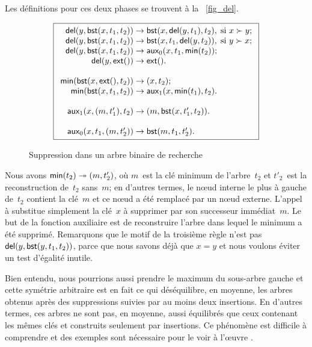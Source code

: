 Les définitions pour ces deux phases se trouvent à la
\fig~\vref{fig_del}.
\begin{figure}[!b]
\begin{equation*}
\boxed{
\begin{array}{r@{\;}l@{\;}l}
  \fun{del}(y,\fun{bst}(x,t_1,t_2)) & \rightarrow &
  \fun{bst}(x,\fun{del}(y,t_1),t_2),\; \text{si \(x \succ y\)};\\
\fun{del}(y,\fun{bst}(x,t_1,t_2)) & \rightarrow &
  \fun{bst}(x,t_1,\fun{del}(y,t_2)),\; \text{si \(y \succ x\)};\\
\fun{del}(y,\fun{bst}(x,t_1,t_2)) & \rightarrow & 
   \fun{aux}_0(x,t_1,\fun{min}(t_2));\\
\fun{del}(y,\fun{ext}()) & \rightarrow & \fun{ext}().\\
\\
\fun{min}(\fun{bst}(x,\fun{ext}(),t_2)) & \rightarrow & \pair{x}{t_2};\\
\fun{min}(\fun{bst}(x,t_1,t_2)) & \rightarrow & 
  \fun{aux}_1(x,\fun{min}(t_1),t_2).\\
\\
\fun{aux}_1(x,\pair{m}{t'_1},t_2) & \rightarrow & 
  \pair{m}{\fun{bst}(x,t'_1,t_2)}.\\
\\
\fun{aux}_0(x,t_1,\pair{m}{t'_2}) & \rightarrow & \fun{bst}(m,t_1,t'_2).
\end{array}}
\end{equation*}
\caption{Suppression dans un arbre binaire de recherche\label{fig_del}}
\end{figure}
Nous avons \(\textsf{min}(t_2) \twoheadrightarrow
({m},{t'_2})\), où \(m\)~est la clé minimum
de l'arbre~\(t_2\) et \(t'_2\)~est la reconstruction de~\(t_2\)
sans~\(m\); en d'autres termes, le n{\oe}ud interne le plus à gauche
de~\(t_2\) contient la clé~\(m\) et ce n{\oe}ud a été remplacé par un
n{\oe}ud externe. L'appel à  substitue simplement la
clé~\(x\) à supprimer par son successeur immédiat~\(m\). Le but de la
fonction auxiliaire  est de reconstruire l'arbre dans
lequel le minimum a été supprimé. Remarquons que le motif de la
troisième règle n'est pas \(\textsf{del}(y,
\textsf{bst}(y,t_1,t_2))\), parce que nous savons
déjà que \(x=y\) et nous voulons éviter un test d'égalité inutile.

Bien entendu, nous pourrions aussi prendre le maximum du sous-arbre
gauche et cette symétrie arbitraire est en fait ce qui déséquilibre,
en moyenne, les arbres obtenus après des suppressions suivies par au
moins deux insertions. En d'autres termes, ces arbres ne sont pas, en
moyenne, aussi équilibrés que ceux contenant les mêmes clés et
construits seulement par insertions. Ce phénomène est difficile à
comprendre et des exemples sont nécessaire pour le voir à l'{\oe}uvre
\citep{Eppinger_1983,CulbersonMunro_1989,CulbersonEvans_1994,Knuth_1998a,Heyer_2009}.

